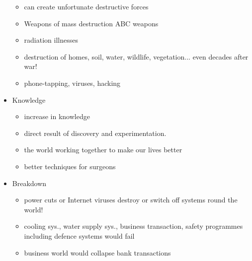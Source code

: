 \documentclass[a5paper,12pt,twoside,titlepage]{scrartcl}
\begin{document}
\begin{itemize}
\begin{itemize}
			\item can create unfortunate destructive forces
			\item Weapons of mass destruction \textrightarrow ABC weapons
			\item \textrightarrow radiation illnesses 
			\item \textrightarrow destruction of homes, soil, water, wildlife, vegetation... even decades after war!
			\item phone-tapping, viruses, hacking
		\end{itemize}
	\item Knowledge
		\begin{itemize}
			\item increase in knowledge
			\item direct result of discovery and experimentation. 
			\item the world working together to make our lives better
			\item better techniques for surgeons
		\end{itemize}
	\item Breakdown
		\begin{itemize}
			\item power cuts or Internet viruses destroy or switch off systems round the world!
			\item cooling sys., water supply sys., business transaction, safety programmes including defence systems would fail
			\item business world would collapse \textrightarrow bank transactions
		\end{itemize}
\end{itemize}
\end{document}
